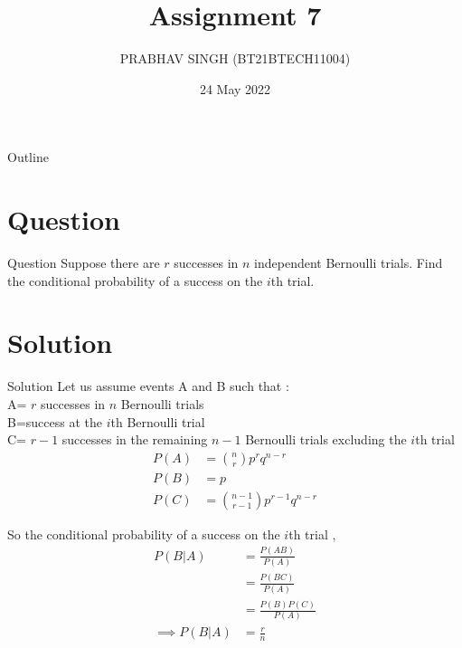 \documentclass{beamer}
\title{Assignment 7}
\author{PRABHAV SINGH (BT21BTECH11004)}
\date{24 May 2022}
\begin{document}
	
	\begin{frame}
		\titlepage 
	\end{frame}
	
	\logo{}
	
	
	\begin{frame}{Outline}
		\tableofcontents
	\end{frame}
	
	\section{Question}
	\begin{frame}{Question}
	Suppose there are $  r  $ successes in $ n $ independent Bernoulli trials. Find the conditional probability of a success on the $ i $th trial.
		
	\end{frame}
	
	
	\section{Solution}
	\begin{frame}{Solution}
	Let us assume events A and B such that :\\
	A= $ r $ successes in $ n $ Bernoulli trials \\
	B=success at the $ i $th Bernoulli trial\\
	C= $ r-1 $ successes in the remaining $ n-1 $ Bernoulli trials excluding 
	the $ i $th trial \\
	\begin{align}
		P(A) &= \binom{n}{r}p^{r}q^{n-r}\\
		P(B) &= p\\
		P(C) &= \binom{n-1}{r-1}p^{r-1}q^{n-r}
	\end{align}
	\end{frame}
	\begin{frame}
	So the conditional probability of a success on the $ i $th trial ,\\
	\begin{align}
		P({B|A}) &= \frac{P(AB)}{P(A)} \\
		&= \frac{P(BC)}{P(A)}\\
		&= \frac{P(B)P(C)}{P(A)}\\
		\implies P(B|A)	&= \frac{r}{n}
	\end{align}
	\end{frame}
	
\end{document}
